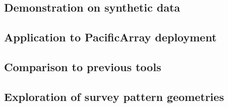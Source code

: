 
\subsection{Demonstration on synthetic data}

\subsection{Application to PacificArray deployment}

\subsection{Comparison to previous tools}

\subsection{Exploration of survey pattern geometries}